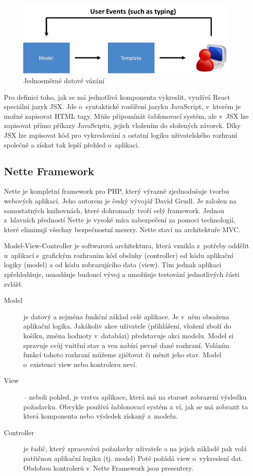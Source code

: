 \documentclass[thesis=B,czech]{FITthesis}[2012/06/26]
\begin{document}
	\begin{figure}
		\includegraphics[width=\textwidth]{databinding2.png}
		\caption{Jednosměrné datové vázání}\label{data_binding}
	\end{figure}

	Pro definici toho, jak se má jednotlivá komponenta vykreslit, využívá React speciální jazyk JSX. Jde o~syntaktické rozšíření jazyku JavaScript, v~kterém je možné zapisovat HTML tagy. Může připomínát šablonovací systém, ale v~JSX lze zapisovat přímo příkazy JavaSciptu, jejich vložením do složených závorek. Díky JSX lze zapisovat kód pro vykreslování a ostatní logiku uživatelského rozhraní společně a získat tak lepší přehled o~aplikaci.\cite{jsx} 
	
\subsection{Nette Framework}
	Nette je kompletní framework pro PHP, který výrazně zjednodušuje tvorbu webových aplikací. Jeho autorem je český vývojář David Grudl. Je založen na samostatných knihovnách, které dohromady tvoří celý framework. Jednou z~hlavních předností Nette je vysoké míra zabezpečení za pomoci technologií, které eliminují všechny bezpečnostní mezery. Nette staví na architektuře MVC.\cite{nette}
	
	Model-View-Controller je softwarová architektura, která vznikla z~potřeby oddělit u~aplikací s~grafickým rozhraním kód obsluhy (controller) od kódu aplikační logiky (model) a od kódu zobrazujícího data (view). Tím jednak aplikaci zpřehledňuje, usnadňuje budoucí vývoj a umožňuje testování jednotlivých části zvlášť.
	
	\begin{description}
		\item[Model] je datový a zejména funkční základ celé aplikace. Je v~něm obsažena aplikační logika. Jakákoliv akce uživatele (přihlášení, vložení zboží do košíku, změna hodnoty v~databázi) představuje akci modelu. Model si spravuje svůj vnitřní stav a ven nabízí pevně dané rozhraní. Voláním funkcí tohoto rozhraní můžeme zjišťovat či měnit jeho stav. Model o~existenci view nebo kontroleru neví.
		\item[View]-- neboli pohled, je vrstva aplikace, která má na starost zobrazení výsledku požadavku. Obvykle používá šablonovací systém a ví, jak se má zobrazit ta která komponenta nebo výsledek získaný z~modelu.
		\item[Controller]je řadič, který zpracovává požadavky uživatele a na jejich základě pak volá patřičnou aplikační logiku (tj. model) Poté požádá view o~vykreslení dat. Obdobou kontrolerů v~Nette Framework jsou presentery.\cite{nette_mvc}
	\end{description}
\end{document}
